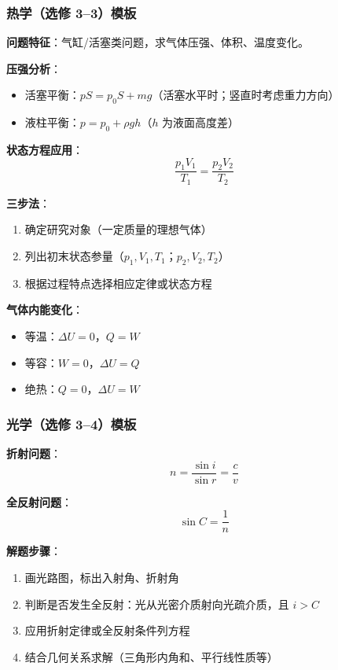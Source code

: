 \subsubsection{热学（选修 3--3）模板}

\textbf{问题特征}：气缸/活塞类问题，求气体压强、体积、温度变化。

\textbf{压强分析}：
\begin{itemize}
  \item 活塞平衡：$pS = p_0S + mg$（活塞水平时；竖直时考虑重力方向）
  \item 液柱平衡：$p = p_0 + \rho gh$（$h$ 为液面高度差）
\end{itemize}

\textbf{状态方程应用}：
\[
\frac{p_1V_1}{T_1} = \frac{p_2V_2}{T_2}
\]

\textbf{三步法}：
\begin{enumerate}
  \item 确定研究对象（一定质量的理想气体）
  \item 列出初末状态参量（$p_1,V_1,T_1$；$p_2,V_2,T_2$）
  \item 根据过程特点选择相应定律或状态方程
\end{enumerate}

\textbf{气体内能变化}：
\begin{itemize}
  \item 等温：$\Delta U = 0$，$Q = W$
  \item 等容：$W = 0$，$\Delta U = Q$
  \item 绝热：$Q = 0$，$\Delta U = W$
\end{itemize}

\subsubsection{光学（选修 3--4）模板}

\textbf{折射问题}：
\[
n = \frac{\sin i}{\sin r} = \frac{c}{v}
\]

\textbf{全反射问题}：
\[
\sin C = \frac{1}{n}
\]

\textbf{解题步骤}：
\begin{enumerate}
  \item 画光路图，标出入射角、折射角
  \item 判断是否发生全反射：光从光密介质射向光疏介质，且 $i > C$
  \item 应用折射定律或全反射条件列方程
  \item 结合几何关系求解（三角形内角和、平行线性质等）
\end{enumerate}


